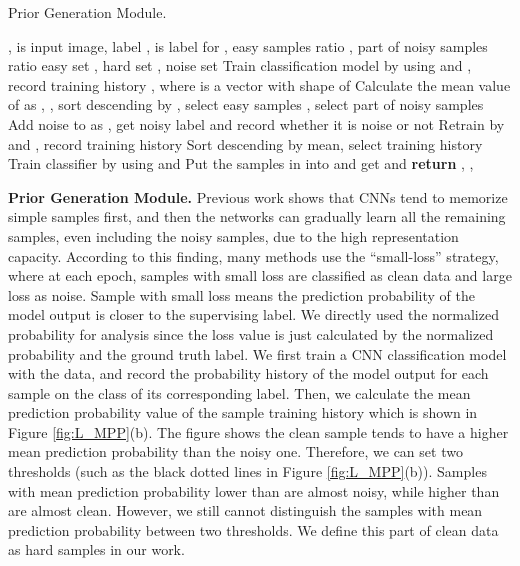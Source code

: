 \documentclass[letterpaper]{article} \usepackage{aaai22}  \usepackage{times}  \usepackage{helvet}  \usepackage{courier}  \usepackage[hyphens]{url}  \usepackage{graphicx} \urlstyle{rm} \def\UrlFont{\rm}  \usepackage{natbib}  \usepackage{caption} \DeclareCaptionStyle{ruled}{labelfont=normalfont,labelsep=colon,strut=off} \frenchspacing  \setlength{\pdfpagewidth}{8.5in}  \setlength{\pdfpageheight}{11in}  \usepackage{algorithm}
\begin{document}
\begin{algorithm}
	\renewcommand{\algorithmicrequire}{\textbf{Input:}}
	\renewcommand{\algorithmicensure}{\textbf{Output:}}
	\caption{Prior Generation Module.}
	\label{alg:ehn}
	\begin{algorithmic}[1]
		\REQUIRE  ,  is input image, label ,  is label for , easy samples ratio , part of noisy samples ratio 
		\ENSURE easy set , hard set , noise set 
		\STATE Train classification model  by using  and , record training history , where  is a vector with shape of 
		\STATE Calculate the mean value of  as , , sort  descending by , select easy samples , select part of noisy samples 
        \STATE Add noise to  as , get noisy label  and record whether it is noise or not 
        \STATE Retrain  by  and , record training history 
        \STATE Sort  descending by mean, select training history  
		\STATE Train classifier  by using  and  
        \STATE Put the samples in  into  and get  and 
        \STATE 
		\STATE \textbf{return} , , 
	\end{algorithmic}  
\end{algorithm}

\textbf{Prior Generation Module.}
Previous work \cite{2016Understanding} shows that CNNs tend to memorize simple samples first, and then the networks can gradually learn all the remaining samples, even including the noisy samples, due to the high representation capacity. According to this finding, many methods use the ``small-loss'' strategy, where at each epoch, samples with small loss are classified as clean data and large loss as noise. Sample with small loss means the prediction probability of the model output is closer to the supervising label. {We directly used the normalized probability for analysis since the loss value is just calculated by the normalized probability and the ground truth label.} We first train a CNN classification model with the data, and record the probability history of the model output for each sample on the class of its corresponding label. {Then,} we calculate the mean prediction probability value of the sample training history which is shown in Figure \ref{fig:L_MPP}(b). The figure shows the clean sample tends to have a higher mean prediction probability than the noisy one. Therefore, we can set two thresholds (such as the black dotted lines in Figure \ref{fig:L_MPP}(b)). Samples with mean prediction probability lower than  are almost noisy, while higher than  are almost clean. However, we still cannot distinguish the samples with mean prediction probability between two thresholds. We define this part of clean data as hard samples in our work. 
\end{document}
